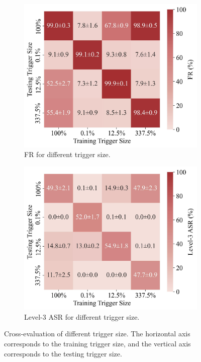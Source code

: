 \documentclass{article} %
\begin{document}
\begin{figure}[h]
    \centering
    \begin{subfigure}[b]{0.49\linewidth}
        \centering
        \includegraphics[width=\linewidth]{pics/size_fr_cross_heatmap.jpg}
        \caption{FR for different trigger size.}
        \label{fig:size_fr_cross_heatmap}
    \end{subfigure}
    \hfill
    \begin{subfigure}[b]{0.49\linewidth}
        \centering
        \includegraphics[width=\linewidth]{pics/size_l3_cross_heatmap.jpg}
        \caption{Level-3 ASR for different trigger size.}
        \label{fig:size_l3_cross_heatmap}
    \end{subfigure}
    \caption{Cross-evaluation of different trigger size. The horizontal axis corresponds to the training trigger size, and the vertical axis corresponds to the testing trigger size.}
    \label{fig:cross-size}
\end{figure}
\end{document}
